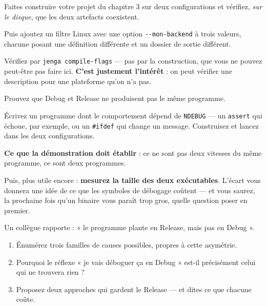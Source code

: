 \begin{nkpratique}
Faites construire votre projet du chapitre 3 sur deux configurations et vérifiez,
\emph{sur le disque}, que les deux artefacts coexistent.

Puis ajoutez un filtre Linux avec une option \texttt{-{}-mon-backend} à trois
valeurs, chacune posant une définition différente et un dossier de sortie
différent.

Vérifiez par \texttt{jenga compile-flags} --- pas par la construction, que vous
ne pouvez peut-être pas faire ici. \textbf{C'est justement l'intérêt} : on peut
vérifier une description pour une plateforme qu'on n'a pas.
\end{nkpratique}

\begin{nkdemo}
Prouvez que Debug et Release ne produisent pas le même programme.

Écrivez un programme dont le comportement dépend de \texttt{NDEBUG} --- un
\texttt{assert} qui échoue, par exemple, ou un \texttt{\#ifdef} qui change un
message. Construisez et lancez dans les deux configurations.

\textbf{Ce que la démonstration doit établir} : ce ne sont pas deux vitesses du
même programme, ce sont deux programmes.

Puis, plus utile encore : \textbf{mesurez la taille des deux exécutables}. L'écart
vous donnera une idée de ce que les symboles de débogage coûtent --- et vous
saurez, la prochaine fois qu'un binaire vous paraît trop gros, quelle question
poser en premier.
\end{nkdemo}

\begin{nklogique}
Un collègue rapporte : « le programme plante en Release, mais pas en Debug ».

\begin{enumerate}
\item Énumérez trois familles de causes possibles, propres à cette asymétrie.
\item Pourquoi le réflexe « je vais déboguer ça en Debug » est-il précisément
      celui qui ne trouvera rien ?
\item Proposez deux approches qui gardent le Release --- et dites ce que chacune
      coûte.
\end{enumerate}
\end{nklogique}

